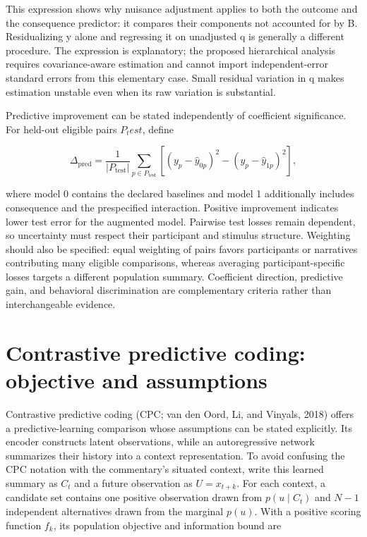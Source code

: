 \documentclass[11pt]{article}
\begin{document}
This expression shows why nuisance adjustment applies to both the
outcome and the consequence predictor: it compares their components not
accounted for by B. Residualizing y alone and regressing it on
unadjusted q is generally a different procedure. The expression is
explanatory; the proposed hierarchical analysis requires
covariance-aware estimation and cannot import independent-error standard
errors from this elementary case. Small residual variation in q makes
estimation unstable even when its raw variation is substantial.

Predictive improvement can be stated independently of coefficient
significance. For held-out eligible pairs \(P_test\), define

\begin{equation}
\Delta_{\mathrm{pred}}=
\frac{1}{|P_{\mathrm{test}}|}\sum_{p\in P_{\mathrm{test}}}
\left[(y_p-\widehat y_{0p})^2-(y_p-\widehat y_{1p})^2\right],
\end{equation}

where model 0 contains the declared baselines and model 1 additionally
includes consequence and the prespecified interaction. Positive
improvement indicates lower test error for the augmented model. Pairwise
test losses remain dependent, so uncertainty must respect their
participant and stimulus structure. Weighting should also be specified:
equal weighting of pairs favors participants or narratives contributing
many eligible comparisons, whereas averaging participant-specific losses
targets a different population summary. Coefficient direction,
predictive gain, and behavioral discrimination are complementary
criteria rather than interchangeable evidence.

\hypertarget{contrastive-predictive-coding-objective-and-assumptions}{%
\section{Contrastive predictive coding: objective and
assumptions}\label{contrastive-predictive-coding-objective-and-assumptions}}

Contrastive predictive coding (CPC; van den Oord, Li, and Vinyals, 2018)
offers a predictive-learning comparison whose assumptions can be stated
explicitly. Its encoder constructs latent observations, while an
autoregressive network summarizes their history into a context
representation. To avoid confusing the CPC notation with the
commentary's situated context, write this learned summary as \(C_t\) and
a future observation as \(U=x_{t+k}\). For each context, a candidate set
contains one positive observation drawn from \(p(u\mid C_t)\) and
\(N-1\) independent alternatives drawn from the marginal \(p(u)\). With
a positive scoring function \(f_k\), its population objective and
information bound are
\end{document}
